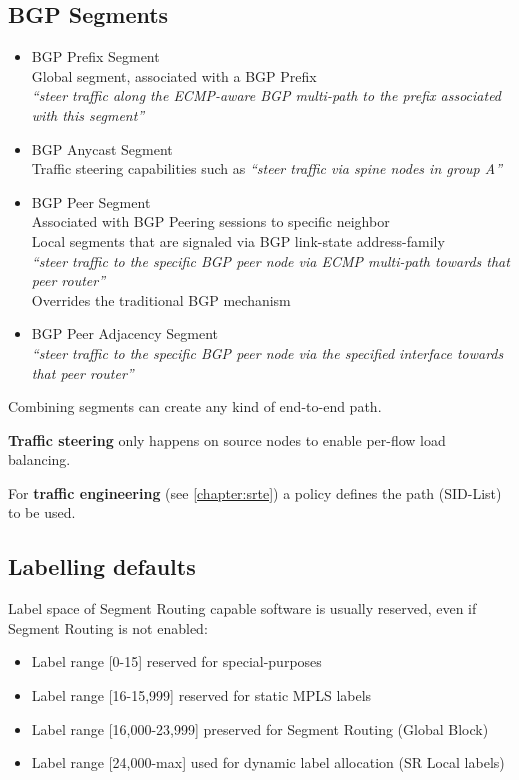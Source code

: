\subsection{BGP Segments}
\begin{itemize}
    \item BGP Prefix Segment \\
    Global segment, associated with a BGP Prefix \\
    \emph{``steer traffic along the ECMP-aware BGP multi-path to the prefix associated with this segment”} 
    \item BGP Anycast Segment \\
    Traffic steering capabilities such as \emph{``steer traffic via spine nodes in group A”} 
    \item BGP Peer Segment \\
    Associated with BGP Peering sessions to specific neighbor \\ 
    Local segments that are signaled via BGP link-state address-family \\
    \emph{``steer traffic to the specific BGP peer node via ECMP multi-path towards that peer router”} \\
    Overrides the traditional BGP mechanism 
    \item BGP Peer Adjacency Segment \\
    \emph{``steer traffic to the specific BGP peer node via the specified interface towards that peer router”}
\end{itemize}

\noindent
Combining segments can create any kind of end-to-end path.

\noindent
\textbf{Traffic steering} only happens on source nodes to enable per-flow load balancing.

\noindent
For \textbf{traffic engineering} (see \ref{chapter:srte}) a policy defines the path (SID-List) to be used. 

\subsection{Labelling defaults}
Label space of Segment Routing capable software is usually reserved, even if Segment Routing is not enabled:

\begin{itemize}
    \item Label range [0-15] reserved for special-purposes
    \item Label range [16-15,999] reserved for static MPLS labels
    \item Label range [16,000-23,999] preserved for Segment Routing (Global Block)
    \item Label range [24,000-max] used for dynamic label allocation (SR Local labels)
\end{itemize}

